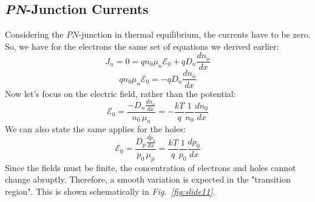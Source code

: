 \subsection{\emph{PN}-Junction Currents}
Considering the $PN$-junction in thermal equilibrium,  the currents have to be zero.  So, we have for the electrons the same set of equations we derived earlier:
    \begin{equation} 
        J_n = 0 = q{n_0}{\mu _n}{\mathcal{E}_0} + q{D_n}\frac{dn_o}{dx}
    \end{equation}
    \begin{equation} 
        q{n_0}{\mu _n}{\mathcal{E}_0} =  - q{D_n}\frac{dn_o}{dx}
    \end{equation}
Now let's focus on the electric field, rather than the potential:
    \begin{equation} 
        \mathcal{E}_0 = \frac{-D_n\frac{dn_o}{dx}} {n_0\,\mu_n} = -\frac{kT}{q}\frac{1}{n_0}\frac{dn_0}{dx} 
    \end{equation}
We can also state the same applies for the holes:
    \begin{equation} 
        \mathcal{E}_0 = \frac{D_p\frac{dp_o}{dx}} {p_0\,\mu_p} = \frac{kT}{q}\frac{1}{p_0}\frac{dp_0}{dx} 
    \end{equation}
Since the fields must be finite, the concentration of electrons and holes cannot change abruptly. Therefore, a smooth variation is expected in the "transition region".  This is shown schematically in \emph{Fig.~\ref{fig:slide11}}.
\newpage
